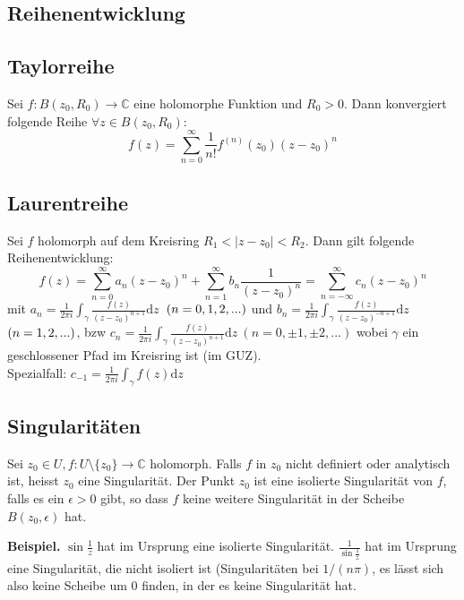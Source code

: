 \documentclass[8pt, a4paper, landscape, fleqn]{scrartcl}
\newenvironment {example}
				{\begin{itshape} \begin{small}}
				{\end{small} \end{itshape}}
\def\C{\mathbb{C}}
\def\d{\text{d}}
\newcommand{\blue}[1]{\textcolor{ethblue}{#1}}
\begin{document}
\begin{multicols*}{3}
	    

        \section{Reihenentwicklung}
	    \subsection{Taylorreihe}
	    Sei $f : B(z_0, R_0) \to \C$ eine holomorphe Funktion und $R_0 > 0$. Dann konvergiert folgende Reihe $\forall z \in B(z_0, R_0)$: 
	    $$ f(z) = \sum_{n = 0}^\infty \frac{1}{n!}f^{(n)}(z_0)(z-z_0)^n$$ 
	    
	    \subsection{Laurentreihe}
	    Sei $f$ holomorph auf dem Kreisring $R_1 < \vert z - z_0 \vert < R_2$. Dann gilt folgende Reihenentwicklung: 
	    $$ f(z) = \sum_{n = 0}^\infty a_n(z-z_0)^n + \sum_{n=1}^\infty b_n \frac{1}{(z-z_0)^n} = \sum_{n = -\infty}^\infty c_n (z-z_0)^n$$ mit $a_n = \frac{1}{2\pi i}\int_\gamma \frac{f(z)}{(z-z_0)^{n+1}}\d z \ $ $\tiny{(n = 0, 1, 2, ...)}$ und $b_n = \frac{1}{2\pi i} \int_\gamma \frac{f(z)}{(z-z_0)^{-n+1}}\d z \ $ $\tiny{(n = 1, 2, ...)}$, bzw $c_n = \frac{1}{2\pi i}\int_\gamma \frac{f(z)}{(z-z_0)^{n+1}}\d z \ (n = 0, \pm 1, \pm 2, ...)$ wobei $\gamma$ ein geschlossener Pfad im Kreisring ist (im GUZ). \\
	    Spezialfall: $c_{-1} = \frac{1}{2\pi i}\int_\gamma f(z)\d z$
	    
	    \subsection{Singularitäten}
	    \label{sec:singularity}
        Sei $ z_0 \in U, f: U\setminus\{z_0\} \to \C$ holomorph. Falls $f$ in $z_0$ nicht definiert oder analytisch ist, heisst $z_0$ eine \blue{Singularität}. Der Punkt $z_0$ ist eine \blue{isolierte Singularität} von $f$, falls es ein $\epsilon > 0$ gibt, so dass $f$ keine weitere Singularität in der Scheibe $B(z_0, \epsilon)$ hat. \\
        \begin{example}
            \textbf{Beispiel. } $\sin\frac{1}{z}$ hat im Ursprung eine isolierte Singularität. $\frac{1}{\sin\frac{1}{z}}$ hat im Ursprung eine Singularität, die nicht isoliert ist (Singularitäten bei $1/(n\pi)$, es lässt sich also keine Scheibe um 0 finden, in der es keine Singularität hat. 
        \end{example}

\end{multicols*}
\end{document}

